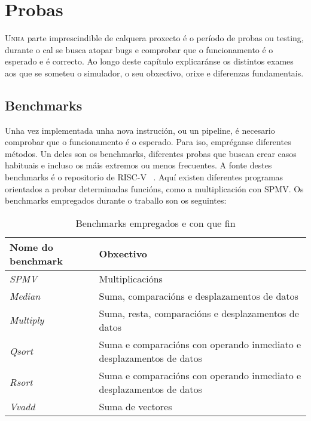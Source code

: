 \chapter{Probas}
\label{chap:probas}

\lettrine{U}{nha} parte imprescindible de calquera proxecto é o período de probas ou testing, durante o cal se busca atopar bugs e comprobar que o funcionamento é o esperado e é correcto. Ao longo deste capítulo explicaránse os distintos exames aos que se someteu o simulador, o seu obxectivo, orixe e diferenzas fundamentais.

\section{Benchmarks}\label{sec:benchmarks}
Unha vez implementada unha nova instrución, ou un pipeline, é necesario comprobar que o funcionamento é o esperado. Para iso, empréganse diferentes métodos. Un deles son os benchmarks, diferentes probas que buscan crear casos habituais e incluso os máis extremos ou menos frecuentes. A fonte destes benchmarks é o repositorio de RISC-V ~\cite{riscv_tests}. Aquí existen diferentes programas orientados a probar determinadas funcións, como a multiplicación con SPMV. Os benchmarks empregados durante o traballo son os seguintes:
\begin{table}[hp!]
  \centering
  \begin{tabular}{|p{5cm}|p{8cm}|}
    \rowcolor{udcpink!25}
    \textbf{Nome do benchmark} & \textbf{Obxectivo} \\\hline
    \textit{SPMV} & Multiplicacións \\
    \textit{Median} & Suma, comparacións e desplazamentos de datos \\
    \textit{Multiply} & Suma, resta, comparacións e desplazamentos de datos \\
    \textit{Qsort} & Suma e comparacións con operando inmediato e desplazamentos de datos \\
    \textit{Rsort} & Suma e comparacións con operando inmediato e desplazamentos de datos \\
    \textit{Vvadd} & Suma de vectores\\
  \end{tabular}
  \caption{Benchmarks empregados e con que fin}
  \label{tab:benchmarks}
\end{table}

